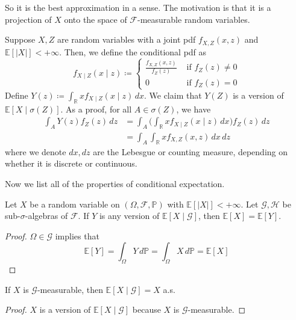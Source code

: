 	So it is the best approximation in a sense. The motivation is that it is a projection of $X$ onto the space of $\mathscr{F}$-measurable random variables. 

	\begin{example}
		Suppose $X, Z$ are random variables with a joint pdf $f_{X, Z} (x, z)$ and $\mathbb{E}[|X|] < +\infty$. Then, we define the conditional pdf as 
		\begin{equation}
			f_{X\mid Z} (x \mid z) \coloneqq \begin{cases} 
				\frac{f_{X, Z} (x, z)}{f_Z (z)} & \text{ if } f_Z (z) \neq 0 \\  
				0 & \text{ if } f_Z (z) = 0 
			\end{cases}
		\end{equation}
		Define $Y(z) \coloneqq \int_{\mathbb{R}} x f_{X \mid Z} (x \mid z) \,dx$. We claim that $Y(Z)$ is a version of $\mathbb{E}[X \mid \sigma(Z)]$. As a proof, for all $A \in \sigma(Z)$, we have 
		\begin{align}
			\int_A Y(z) f_Z (z) \,dz & = \int_A \bigg( \int_{\mathbb{R}} x f_{X \mid Z} (x \mid z) \,dx \bigg) f_Z (z) \,dz \\ 
															 & = \int_A \int_{\mathbb{R}} x f_{X, Z} (x, z)\,dx\,dz
		\end{align}
		where we denote $dx, dz$ are the Lebesgue or counting measure, depending on whether it is discrete or continuous. 
	\end{example}

	Now we list all of the properties of conditional expectation. 

	\begin{theorem}
		Let $X$ be a random variable on $(\Omega, \mathscr{F}, \mathbb{P})$ with $\mathbb{E}[|X|] < +\infty$. Let $\mathscr{G}, \mathscr{H}$ be sub-$\sigma$-algebras of $\mathscr{F}$. If $Y$ is any version of $\mathbb{E}[X \mid \mathscr{G}]$, then $\mathbb{E}[X] = \mathbb{E}[Y]$. 
	\end{theorem}
	\begin{proof}
	  $\Omega \in \mathscr{G}$ implies that 
		\begin{equation}
			\mathbb{E}[Y] = \int_\Omega Y \,d\mathbb{P} = \int_{\Omega} X \,d\mathbb{P} = \mathbb{E}[X]
		\end{equation}
	\end{proof}

	\begin{theorem}
		If $X$ is $\mathscr{G}$-measurable, then $\mathbb{E}[X \mid \mathscr{G}] = X$ a.s. 
	\end{theorem}
	\begin{proof}
		$X$ is a version of $\mathbb{E}[X \mid \mathscr{G}]$ because $X$ is $\mathscr{G}$-measurable. 
	\end{proof}

